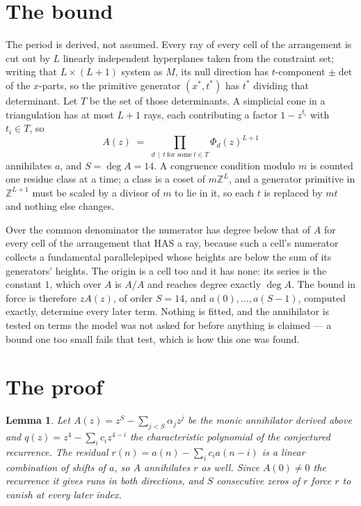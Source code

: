 \documentclass[11pt,a4paper]{article}
\theoremstyle{plain}
\newtheorem{lemma}[theorem]{Lemma}
\theoremstyle{definition}
\begin{document}
\section{The bound}

The period is derived, not assumed. Every ray of every cell of the arrangement is cut out by
$L$ linearly independent hyperplanes taken from the constraint set; writing that $L\times(L+1)$
system as $M$, its null direction has $t$-component $\pm\det$ of the $x$-parts, so the
primitive generator $(x^*,t^*)$ has $t^*$ dividing that determinant. Let $T$ be the set of
those determinants. A simplicial cone in a triangulation has at most $L+1$ rays, each
contributing a factor $1-z^{t_i}$ with $t_i\in T$, so
\[
A(z)\;=\;\prod_{d\,\mid\,t\ \text{for some}\ t\in T}\Phi_d(z)^{L+1}
\]
annihilates $a$, and $S=\deg A=14$. A congruence condition modulo $m$ is counted one residue
class at a time; a class is a coset of $m\mathbb{Z}^L$, and a generator primitive in
$\mathbb{Z}^{L+1}$ must be scaled by a divisor of $m$ to lie in it, so each $t$ is replaced
by $mt$ and nothing else changes.

Over the common denominator the numerator has degree below that of $A$ for every cell of the
arrangement that HAS a ray, because such a cell's numerator collects a fundamental
parallelepiped whose heights are below the sum of its generators' heights. The origin is a cell
too and it has none: its series is the constant $1$, which over $A$ is $A/A$ and reaches degree
exactly $\deg A$. The bound in force is therefore $zA(z)$, of order $S=14$, and
$a(0),\dots,a(S-1)$, computed exactly, determine every later term. Nothing is fitted, and the
annihilator is tested on terms the model was not asked for before anything is claimed --- a
bound one too small fails that test, which is how this one was found.

\section{The proof}

\begin{lemma}\label{lem:crit}
Let $A(z)=z^S-\sum_{j<S}\alpha_jz^{j}$ be the monic annihilator derived above and
$q(z)=z^{4}-\sum_ic_iz^{4-i}$ the characteristic polynomial of the conjectured
recurrence. The residual $r(n)=a(n)-\sum_ic_ia(n-i)$ is a linear combination of shifts of $a$,
so $A$ annihilates $r$ as well. Since $A(0)\ne0$ the recurrence it gives runs in both
directions, and $S$ consecutive zeros of $r$ force $r$ to vanish at every later index.
\end{lemma}
\end{document}
